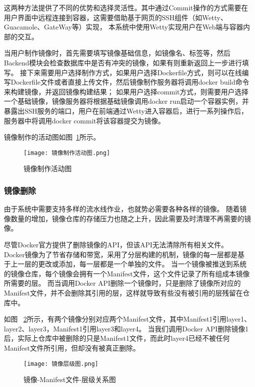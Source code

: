 这两种方法提供了不同的优势和选择灵活性。其中通过Commit操作的方式需要在用户界面中远程连接到容器，这需要借助基于网页的SSH组件（如Wetty、Guacamole、GateWay等）实现，
本系统中使用Wetty实现用户在Web端与容器内部的交互。

当用户制作镜像时，首先需要填写镜像基础信息，如镜像名、标签等，然后Backend模块会检查数据库中是否有冲突的镜像，如果有则重新返回上一步进行填写。
接下来需要用户选择制作方式，如果用户选择Dockerfile方式，则可以在线编写Dockerfile文件或者直接上传文件，然后镜像制作服务器将调用docker build命令来构建镜像，并返回镜像构建结果；
如果用户选择commit方式，则需要用户选择一个基础镜像，镜像服务器将根据基础镜像调用docker run启动一个容器实例，并暴露出SSH服务的端口，用户在前端通过Wetty进入容器后，进行一系列操作后，
服务器中将调用docker commit将该容器提交为镜像。

镜像制作的活动图如图~\ref{fig:镜像制作活动图}所示。

\begin{figure}[h]
  \centering
  \texttt{[image: 镜像制作活动图.png]}
  \caption{镜像制作活动图}
  \label{fig:镜像制作活动图}
\end{figure}

\subsubsection{镜像删除}

由于系统中需要支持多样的流水线作业，也就势必需要各种各样的镜像。
随着镜像数量的增加，镜像仓库的存储压力也随之上升，因此需要及时清理不再需要的镜像。

尽管Docker官方提供了删除镜像的API，但该API无法清除所有相关文件。
Docker镜像为了节省存储和带宽，采用了分层构建的机制，镜像的每一层都是基于上一层的更改或添加，每一层都是一个单独的文件。
当一个镜像被推送到系统的镜像仓库，每个镜像会拥有一个Manifest文件，这个文件记录了所有组成本镜像所需要的层。
而当调用Docker API删除一个镜像时，只是删除了镜像所对应的Manifest文件，并不会删除其引用的层，这样就导致有些没有被引用的层残留在仓库中。

如图~ \ref{fig:镜像-Manifest文件-层级关系图}所示，有两个镜像分别对应两个Manifest文件，其中Manifest1引用layer1、layer2、layer3，Manifest1引用layer3和layer4。
当我们调用Docker API删除镜像1后，实际上仓库中被删除的只是Manifest1文件，而此时layer4已经不被任何Manifest文件所引用，但却没有被真正删除。

\begin{figure}[h]
  \centering
  \texttt{[image: 镜像层级图.png]}
  \caption{镜像-Manifest文件-层级关系图}
  \label{fig:镜像-Manifest文件-层级关系图}
\end{figure}

